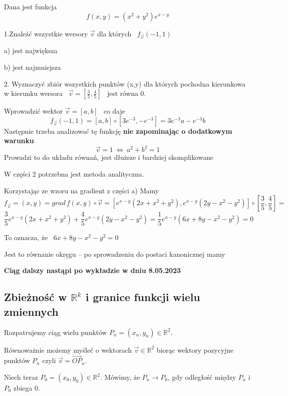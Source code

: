 \begin{przyklad}
    Dana jest funkcja \ \[ f(x,y) = (x^2 + y^2)e^{x-y} \]

    1.Znaleźć wszystkie wersory $\vec{v}$ dla których \ $ f_{\vec{v}} (-1, 1) $
    
    a) jest największa

    b) jest najmniejsza \medskip

    2. Wyznaczyć zbiór wszystkich punktów (x,y) dla których pochodna kierunkowa w kierunku wersora \ $ \vec{v} = \left[ \frac{3}{5}, \frac{4}{5} \right] $ \ jest równa 0.
    \bigskip

    Wprowadzić wektor $ \vec{v} = [a,b] $ \ co daje
    \[ f_{\vec{v}} (-1, 1) = [a,b] \circ [3e^{-3}, -e^{-3}] = 3e^{-3} a - e^{-3}b \]
    Następnie trzeba analizować tę funkcję \textbf{nie zapominając o dodatkowym warunku}
    \[ \vec{v} = 1 \ \Leftrightarrow \ a^2 + b^2 = 1 \]
    Prowadzi to do układu równań, jest dłuższe i bardziej skomplikowane

    W części 2 potrzebna jest metoda analityczna.
    
    Korzystając ze wzoru na gradient z części a) Mamy
    \[ f_{\vec{v}} = (x,y) = grad\, f(x,y) \circ \vec{v} = [e^{x-y} (2x + x^2 + y^2), e^{x-y}(2y - x^2 - y^2)] \circ \left[ \frac{3}{5}, \frac{4}{5} \right] = \]
    \[ \frac{3}{5} e^{x-y} (2x + x^2 + y^2) + \frac{4}{5} e^{x-y} (2y - x^2 - y^2) = \frac{1}{5} e^{x-y} (6x + 8y - x^2 - y^2) = 0 \]

    To oznacza, że \ $ 6x + 8y - x^2 - y^2 = 0 $

    Jest to równanie okręgu -- po sprowadzeniu do postaci kanonicznej mamy \bigskip

    \textbf{Ciąg dalszy nastąpi po wykładzie w dniu 8.05.2023}
\end{przyklad}

\subsection*{Zbieżność w $\mathbb{R}^k$ i granice funkcji wielu zmiennych}

Rozpatrujemy ciąg wielu punktów $ P_n = (x_n, y_n) \in \mathbb{R}^2 $.

Równoważnie możemy myśleć o wektorach $ \vec{v} \in \mathbb{R}^2 $ biorąc wektory pozycyjne punktów $P_n$ czyli $\vec{v} = \vec{OP}_n$.

Niech teraz $ P_0 = (x_0, y_0) \in \mathbb{R}^2 $. Mówimy, że $ P_n \to P_0 $, gdy odległość między $P_n$ i $P_0$ zbiega $0$.

